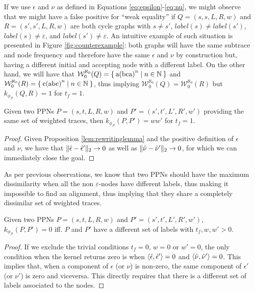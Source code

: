 \begin{example}
	If we use $\epsilon$ and $\nu$ as defined in Equations \ref{eq:epsilon}-\ref{eq:nu}, we might observe that we might have a false positive for ``weak equality'' if $Q=(s,s,L,R,w)$ and $R=(s',s',L,R,w)$ are both cycle graphs with $s\neq s'$, $\textit{label}(s)\neq\textit{label}(s')$, $\textit{label}(s)\neq\varepsilon$, and $\textit{label}(s')\neq\varepsilon$. An intuitive example of such situation is presented in Figure \ref{fig:counterexample}: both graphs will have the same subtrace and node frequency and therefore have the same  $\epsilon$ and $\nu$ by construction but, having a different initial and accepting node with a different label. On the other hand, we will have that $\mathcal{W}_0^{\aleph_0}(Q)=\Set{\textup{a(bca)}^n|n\in\mathbb{N}}$ and $\mathcal{W}_0^{\aleph_0}(R)=\Set{\textup{c(abc)}^n|n\in\mathbb{N}}$, thus implying $\mathcal{W}_0^{\aleph_0}(Q)=\mathcal{W}_0^{\aleph_0}(R)$ but $k_{\phi_{\mathcal{P}}}(Q,R)=1$ for $t_f=1$.
\end{example}


\begin{lemma}
Given two PPNs $P=(s,t,L,R,w)$ and $P'=(s',t',L',R',w')$ providing the same set of weighted traces, then $k_{\phi_{\mathcal{P}}}(P,P')=ww'$ for $t_f=1$.
\end{lemma}
\begin{proof}
Given Proposition \ref{lem:rewritinglemma} and the positive definition of $\epsilon$ and $\nu$,  we have that $\|\hat{\epsilon}-\hat{\epsilon}'\|_{2}\to 0$ as well as $\|\hat{\nu}-\hat{\nu}'\|_{2}\to 0$, for which we can immediately close the goal.
\end{proof}

As per previous observations, we know that two PPNs should have the maximum dissimilarity when all the non $\varepsilon$-nodes have different labels, thus making it impossible to find an alignment, thus implying that they share a completely dissimilar set of weighted traces.

\begin{lemma}
Given two PPNs $P=(s,t,L,R,w)$ and $P'=(s',t',L',R',w')$, $k_{\phi_{\mathcal{P}}}(P,P')=0$ iff. $P$ and $P'$ have a different set of labels with $t_f,w,w'>0$.
\end{lemma}
\begin{proof}
If we exclude the trivial conditions $t_f=0$, $w=0$ or $w'=0$, the only condition when the kernel returns zero is when  $\Braket{\hat{\epsilon},\hat{\epsilon}'}=0$ and $\Braket{\hat{\nu},\hat{\nu}'}=0$. This implies that, when a component of $\epsilon$ (or $\nu$) is non-zero, the same component of $\epsilon'$ (or $\nu'$) is zero and viceversa. This directly requires that there is a different set of labels associated to the nodes. 
\end{proof}

